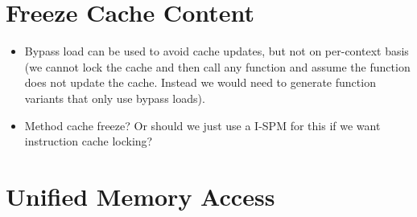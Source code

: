 \documentclass[a4paper,fontsize=10pt,twoside,DIV15,BCOR12mm,headinclude=true,footinclude=false,pagesize,bibtotoc]{scrbook}
\newcommand{\comment}[3]{

\textsf{\textbf{#1}} {\color{#3}#2}}
\newcommand{\martin}[1]{\comment{Martin}{#1}{Blue}}
\newcommand{\stefan}[1]{\comment{Stefan}{#1}{RoyalPurple}}
\renewcommand{\martin}[1]{}
\renewcommand{\stefan}[1]{}
\begin{document}
\stefan{Might not gain much: for LRU caches there is no need to purge, we might need to purge the stack cache on context switches anyway,
and for the method cache, purging the cache might also not gain much (depending on the used analysis). I do not think that Self-modifying
should be used in hard real-time code anyway, as it might introduce some slight problems to the WCET analysis ;) }

\section{Freeze Cache Content}

\begin{itemize}
  \item Bypass load can be used to avoid cache updates, but not on per-context basis (we cannot lock the cache and then call any function
  and assume the function does not update the cache. Instead we would need to generate function variants that only use bypass loads).
  \item Method cache freeze? Or should we just use a I-SPM for this if we want instruction cache locking?
\end{itemize}

\section{Unified Memory Access}

\stefan{All our memories (except the stack cache) use a unified address space, but due to the typed loads, references must include both address and
type of the cache. Since the type is encoded in the code, any generated code can only use one type of cache or SPM.
If we have a function with $m$ arguments and $n$ different caches or ways of accessing
memory, in the worst case we would need $m^n$ copies of that function to handle all cases (increases instruction cache costs!). We also need to expose this to the programmer,
either through having different names for the functions (very ugly and annoying to use, remember that this is transitive, you need to copy
your whole libraries!), or by having a type system on top of the C types, which means implementing some sort of overloading in C and
auto-generating variants of functions.

Note: we need typed loads to tell the processor which cache (not) to use. We also need a shadow stack not only due to typed loads,
but also due to the write-back policy of the stack cache (would make consistency a night-mare if we would allow to access stack-cache
allocated data over the data cache!).
}
\martin{we discussed that issue in The Vienna mini workshop and should continue to discuss it.}
\end{document}

